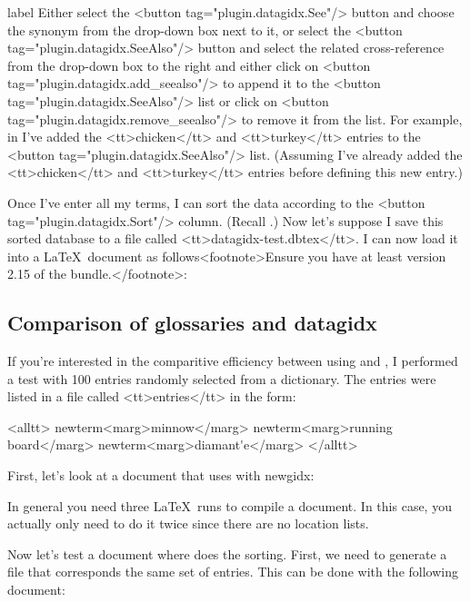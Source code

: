 \begin{example}{label}{}
   Either select the <button tag="plugin.datagidx.See"/> button and choose
   the synonym from the drop-down box next to it, or select the 
   <button tag="plugin.datagidx.SeeAlso"/> button and select the related 
   cross-reference from the drop-down box to the right and either click on
   <button tag="plugin.datagidx.add_seealso"/> to append it to the 
   <button tag="plugin.datagidx.SeeAlso"/> list or click on 
   <button tag="plugin.datagidx.remove_seealso"/> to remove it from the list.
   For example, in  I've added the <tt>chicken</tt>
   and <tt>turkey</tt> entries to the <button tag="plugin.datagidx.SeeAlso"/>
   list. (Assuming I've already added the <tt>chicken</tt> and <tt>turkey</tt>
   entries before defining this new entry.)


   Once I've enter all my terms, I can sort the data according to 
   the <button tag="plugin.datagidx.Sort"/> column. (Recall .)
   Now let's suppose I save this sorted database to a file
   called <tt>datagidx-test.dbtex</tt>. I can now load it into 
   a \LaTeX\ document as follows<footnote>Ensure you have at least
   version 2.15 of the  bundle.</footnote>:


\end{example}

\subsection{Comparison of glossaries and datagidx}\label{sec:comparison}

   If you're interested in the comparitive efficiency between
   using  and , I performed
   a test with 100 entries randomly selected from a dictionary.
   The entries were listed in a file called <tt>entries</tt> in
   the form:

<alltt>
\gls{newterm}<marg>minnow</marg>
\gls{newterm}<marg>running board</marg>
\gls{newterm}<marg>diamant\gls{'}e</marg>
</alltt>

   First, let's look at a document that uses  with \gls{newgidx}:



   In general you need three \LaTeX\ runs to compile a 
   document. In this case, you actually only need to do it twice
   since there are no location lists.


   Now let's test a  document where  does the
   sorting. First, we need to generate a 
   file that corresponds the same set of entries. This can be done
   with the following document:


